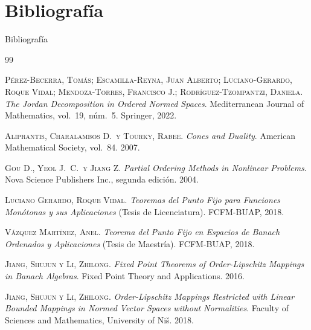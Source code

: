 \documentclass{beamer}
\begin{document}
\appendix

\section{Bibliografía}

\begin{frame}{Bibliografía}
\footnotesize
\begin{thebibliography}{99}

    \textsc{Pérez-Becerra, Tomás; Escamilla-Reyna, Juan Alberto;
    Luciano-Gerardo, Roque Vidal; Mendoza-Torres, Francisco J.;
    Rodríguez-Tzompantzi, Daniela}.
    \textit{The Jordan Decomposition in Ordered Normed Spaces}.
    Mediterranean Journal of Mathematics, vol.\ 19, núm.\ 5. Springer, 2022.

    \textsc{Aliprantis, Charalambos D.\ y Tourky, Rabee}.
    \textit{Cones and Duality}.
    American Mathematical Society, vol.\ 84. 2007.

    \textsc{Gou D., Yeol J.\ C.\ y Jiang Z.}
    \textit{Partial Ordering Methods in Nonlinear Problems}.
    Nova Science Publishers Inc., segunda edición. 2004.

    \textsc{Luciano Gerardo, Roque Vidal}.
    \textit{Teoremas del Punto Fijo para Funciones Monótonas y sus Aplicaciones}
    (Tesis de Licenciatura). FCFM-BUAP, 2018.

    \textsc{Vázquez Martínez, Anel}.
    \textit{Teorema del Punto Fijo en Espacios de Banach Ordenados y Aplicaciones}
    (Tesis de Maestría). FCFM-BUAP, 2018.

    \textsc{Jiang, Shujun y Li, Zhilong}.
    \textit{Fixed Point Theorems of Order-Lipschitz Mappings in Banach Algebras}.
    Fixed Point Theory and Applications. 2016.

    \textsc{Jiang, Shujun y Li, Zhilong}.
    \textit{Order-Lipschitz Mappings Restricted with Linear Bounded Mappings
    in Normed Vector Spaces without Normalities}.
    Faculty of Sciences and Mathematics, University of Niš. 2018.

\end{thebibliography}
\end{frame}
\end{document}
